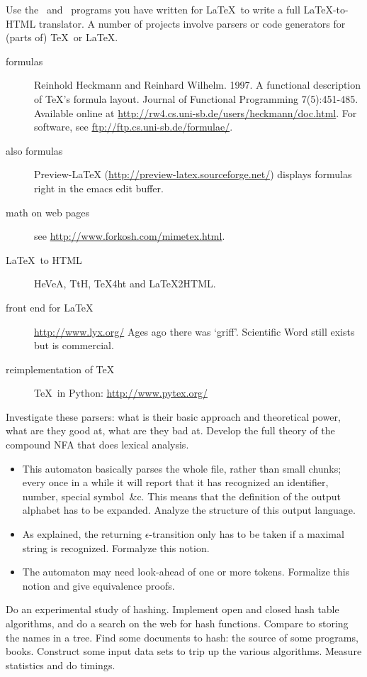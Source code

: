 \project Use the \lex\ and \yacc\ programs you have written for
\LaTeX\ to write a full \LaTeX-to-HTML translator.
%
%
%
\project A number of projects involve parsers or code generators for (parts of)
\TeX\ or \LaTeX.
\begin{description}
\item[formulas]
Reinhold Heckmann and Reinhard Wilhelm. 1997.  A functional
description of TeX's formula layout.  Journal of Functional
Programming 7(5):451-485. Available online at
\url{http://rw4.cs.uni-sb.de/users/heckmann/doc.html}.
For software, see \url{ftp://ftp.cs.uni-sb.de/formulae/}.
\item[also formulas]
Preview-LaTeX (\url{http://preview-latex.sourceforge.net/}) displays
formulas right in the emacs edit buffer.
\item[math on web pages]see \url{http://www.forkosh.com/mimetex.html}.
\item[\LaTeX\ to HTML] HeVeA, TtH, TeX4ht and LaTeX2HTML.
\item[front end for \LaTeX] \url{http://www.lyx.org/}
Ages ago there was `griff'. Scientific Word still exists but is commercial.
\item[reimplementation of \TeX] \TeX\ in Python: \url{http://www.pytex.org/}
\end{description}
Investigate these parsers: what is their basic approach and theoretical
power, what are they good at, what are they bad at.
%
%
%
\project Develop the full theory of the compound NFA that does lexical
analysis.
\begin{itemize}
\item This automaton basically parses the whole file, rather than
  small chunks; every once in a while it will report that it has
  recognized an identifier, number, special symbol~\&c. This means
  that the definition of the output alphabet has to be
  expanded. Analyze the structure of this output language.
\item As explained, the returning $\epsilon$-transition only has to be
  taken if a maximal string is recognized. Formalyze this notion.
\item The automaton may need look-ahead of one or more
  tokens. Formalize this notion and give equivalence proofs.
\end{itemize}
%
%
%
\project Do an experimental study of hashing. Implement open and
closed hash table algorithms, and do a search on the web for hash
functions. Compare to storing the names in a tree.
Find some documents to hash: the source of some programs,
books. Construct some input data sets to trip up the various
algorithms.
Measure statistics and do timings.
